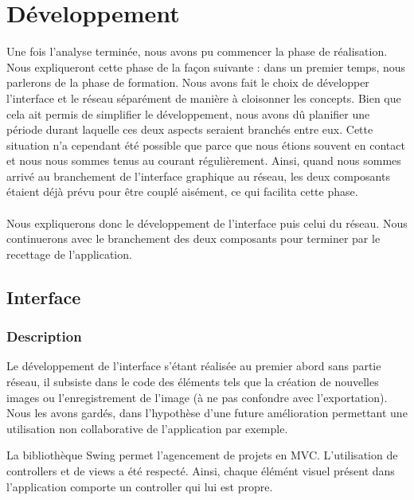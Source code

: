\documentclass[a4paper,11pt]{article}
\begin{document}
\section{Développement}
Une fois l'analyse terminée, nous avons pu commencer la phase de réalisation. Nous expliqueront cette phase de la façon suivante : dans un premier temps, nous parlerons de la phase de formation. Nous avons fait le choix de développer l'interface et le réseau séparément de manière à cloisonner les concepts. Bien que cela ait permis de simplifier le développement, nous avons d\^u planifier une période durant laquelle ces deux aspects seraient branchés entre eux. Cette situation n'a cependant été possible que parce que nous étions souvent en contact et nous nous sommes tenus au courant régulièrement. Ainsi, quand nous sommes arrivé au branchement de l'interface graphique au réseau, les deux composants étaient déjà prévu pour être couplé aisément, ce qui facilita cette phase.

\paragraph{} Nous expliquerons donc le développement de l'interface puis celui du réseau. Nous continuerons avec le branchement des deux composants pour terminer par le recettage de l'application.

\subsection{Interface}

\subsubsection{Description}

Le d\'eveloppement de l'interface s'\'etant r\'ealis\'ee au premier abord sans partie r\'eseau, il subsiste dans le code des \'el\'ements tels que la cr\'eation de nouvelles images ou l'enregistrement de l'image (\`a ne pas confondre avec l'exportation). Nous les avons gard\'es, dans l'hypoth\`ese d'une future am\'elioration permettant une utilisation non collaborative de l'application par exemple. 

La bibliothèque Swing permet l'agencement de projets en MVC. L'utilisation de \og controllers \fg et de \og views \fg a \'et\'e respect\'e. Ainsi, chaque \'el\'em\'ent visuel pr\'esent dans l'application comporte un \og controller \fg qui lui est propre. 
\end{document}

